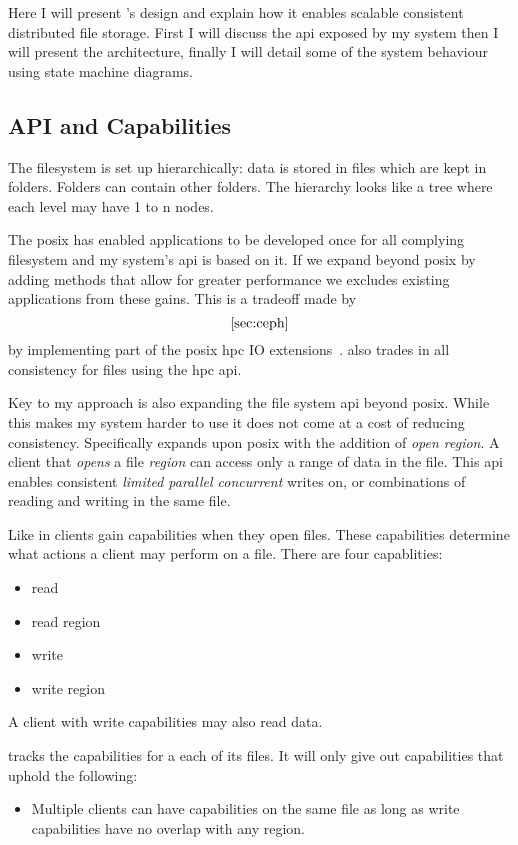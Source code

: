 Here I will present \name{}'s design and explain how it enables scalable consistent distributed file storage. First I will discuss the \ac{api} exposed by my system then I will present the architecture, finally I will detail some of the system behaviour using state machine diagrams. 
%
\subsection{API and Capabilities}
The filesystem is set up hierarchically: data is stored in files which are kept in folders. Folders can contain other folders. The hierarchy looks like a tree where each level may have 1 to n nodes.

The \ac{posix} has enabled applications to be developed once for all complying filesystem and my system's \ac{api} is based on it. If we expand beyond \ac{posix} by adding methods that allow for greater performance we excludes existing applications from these gains. This is a tradeoff made by \ceph{}~\[\cref{sec:ceph}\] by implementing part of the \ac{posix} \ac{hpc} IO extensions~\cite{hpc_posix}. \ceph{} also trades in all consistency for files using the \ac{hpc} \ac{api}. 

Key to my approach is also expanding the file system \ac{api} beyond posix. While this makes my system harder to use it does not come at a cost of reducing consistency. Specifically \name{} expands upon \ac{posix} with the addition of \textsl{open region}. A client that \textit{opens} a file \textit{region} can access only a range of data in the file. This \ac{api} enables consistent \emph{limited parallel concurrent} writes on, or combinations of reading and writing in the same file.

Like \ceph{} in \name{} clients gain capabilities when they open files. These capabilities determine what actions a client may perform on a file. There are four capablities: \nopagebreak
%
\begin{multicols}{4} %
\begin{itemize}
	\item read
	\item read region
	\item write
	\item write region
\end{itemize}
\end{multicols}
%
A client with write capabilities may also read data. 

\begin{samepage}
\Name{} tracks the capabilities for a each of its files. It will only give out capabilities that uphold the following:
%
\begin{itemize}
	\item Multiple clients can have capabilities on the same file as long as write capabilities have no overlap with any region.
\end{itemize}
\end{samepage}
% 
